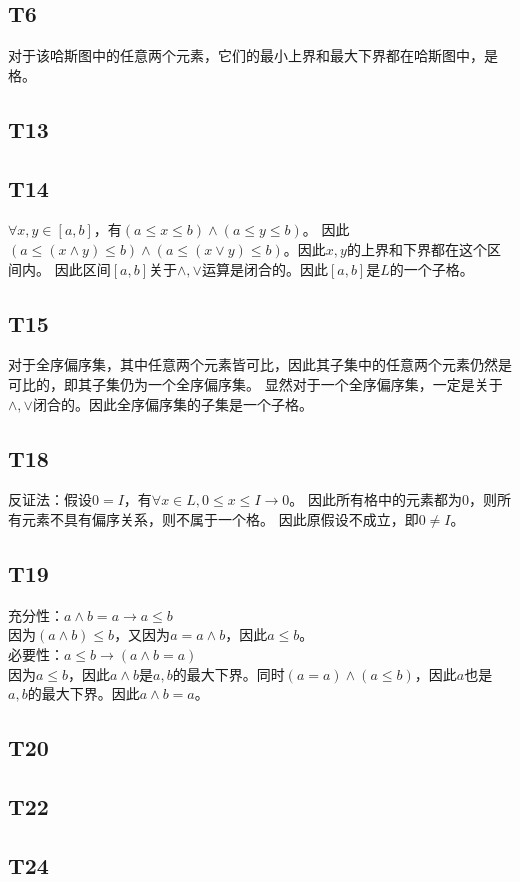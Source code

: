\documentclass{article}
\begin{document}
\subsection{T6}
对于该哈斯图中的任意两个元素，它们的最小上界和最大下界都在哈斯图中，是格。
\subsection{T13}

\subsection{T14}
$\forall x, y \in [a, b]$，有$(a \leq x \leq b) \land (a \leq y \leq b)$。
因此$(a \leq (x \land y) \leq b) \land (a \leq (x \lor y) \leq b)$。因此$x, y$的上界和下界都在这个区间内。
因此区间$[a, b]$关于$\land,\lor$运算是闭合的。因此$[a, b]$是$L$的一个子格。
\subsection{T15}
对于全序偏序集，其中任意两个元素皆可比，因此其子集中的任意两个元素仍然是可比的，即其子集仍为一个全序偏序集。
显然对于一个全序偏序集，一定是关于$\land,\lor$闭合的。因此全序偏序集的子集是一个子格。
\subsection{T18}
反证法：假设$0 = I$，有$\forall x \in L, 0 \leq x \leq I \rightarrow 0$。
因此所有格中的元素都为$0$，则所有元素不具有偏序关系，则不属于一个格。
因此原假设不成立，即$0 \neq I$。
\subsection{T19}
充分性：$a \land b = a \rightarrow a \leq b$\\
因为$(a \land b) \leq b$，又因为$a = a \land b$，因此$a \leq b$。\\
必要性：$a \leq b \rightarrow (a \land b = a)$\\
因为$a \leq b$，因此$a \land b$是$a, b$的最大下界。同时$(a = a) \land (a \leq b)$，因此$a$也是
$a, b$的最大下界。因此$a \land b = a$。
\subsection{T20}
\subsection{T22}
\subsection{T24}
\end{document}

